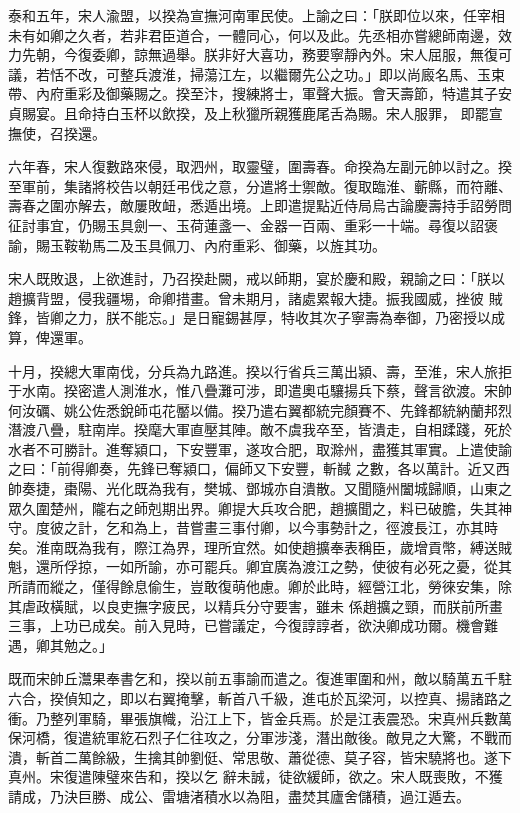 \begin{pinyinscope}
 泰和五年，宋人渝盟，以揆為宣撫河南軍民使。上諭之曰：「朕即位以來，任宰相未有如卿之久者，若非君臣道合，一體同心，何以及此。先丞相亦嘗總師南邊，效力先朝，今復委卿，諒無過舉。朕非好大喜功，務要寧靜內外。宋人屈服，無復可議，若恬不改，可整兵渡淮，掃蕩江左，以繼爾先公之功。」即以尚廄名馬、玉束帶、內府重彩及御藥賜之。揆至汴，搜練將士，軍聲大振。會天壽節，特遣其子安貞賜宴。且命持白玉杯以飲揆，及上秋獵所親獲鹿尾舌為賜。宋人服罪，
 即罷宣撫使，召揆還。



 六年春，宋人復數路來侵，取泗州，取靈璧，圍壽春。命揆為左副元帥以討之。揆至軍前，集諸將校告以朝廷弔伐之意，分遣將士禦敵。復取臨淮、蘄縣，而符離、壽春之圍亦解去，敵屢敗衄，悉遁出境。上即遣提點近侍局烏古論慶壽持手詔勞問征討事宜，仍賜玉具劍一、玉荷蓮盞一、金器一百兩、重彩一十端。尋復以詔褒諭，賜玉鞍勒馬二及玉具佩刀、內府重彩、御藥，以旌其功。



 宋人既敗退，上欲進討，乃召揆赴闕，戒以師期，宴於慶和殿，親諭之曰：「朕以趙擴背盟，侵我疆埸，命卿措畫。曾未期月，諸處累報大捷。振我國威，挫彼
 賊鋒，皆卿之力，朕不能忘。」是日寵錫甚厚，特收其次子寧壽為奉御，乃密授以成算，俾還軍。



 十月，揆總大軍南伐，分兵為九路進。揆以行省兵三萬出潁、壽，至淮，宋人旅拒于水南。揆密遣人測淮水，惟八疊灘可涉，即遣奧屯驤揚兵下蔡，聲言欲渡。宋帥何汝礪、姚公佐悉銳師屯花靨以備。揆乃遣右翼都統完顏賽不、先鋒都統納蘭邦烈潛渡八疊，駐南岸。揆麾大軍直壓其陣。敵不虞我卒至，皆潰走，自相蹂踐，死於水者不可勝計。進奪潁口，下安豐軍，遂攻合肥，取滁州，盡獲其軍實。上遣使諭之曰：「前得卿奏，先鋒已奪潁口，偏師又下安豐，斬馘
 之數，各以萬計。近又西帥奏捷，棗陽、光化既為我有，樊城、鄧城亦自潰散。又聞隨州闔城歸順，山東之眾久圍楚州，隴右之師剋期出界。卿提大兵攻合肥，趙擴聞之，料已破膽，失其神守。度彼之計，乞和為上，昔嘗畫三事付卿，以今事勢計之，徑渡長江，亦其時矣。淮南既為我有，際江為界，理所宜然。如使趙擴奉表稱臣，歲增貢幣，縛送賊魁，還所俘掠，一如所諭，亦可罷兵。卿宜廣為渡江之勢，使彼有必死之憂，從其所請而縱之，僅得餘息偷生，豈敢復萌他慮。卿於此時，經營江北，勞徠安集，除其虐政橫賦，以良吏撫字疲民，以精兵分守要害，雖未
 係趙擴之頸，而朕前所畫三事，上功已成矣。前入見時，已嘗議定，今復諄諄者，欲決卿成功爾。機會難遇，卿其勉之。」



 既而宋帥丘灊果奉書乞和，揆以前五事諭而遣之。復進軍圍和州，敵以騎萬五千駐六合，揆偵知之，即以右翼掩擊，斬首八千級，進屯於瓦梁河，以控真、揚諸路之衝。乃整列軍騎，畢張旗幟，沿江上下，皆金兵焉。於是江表震恐。宋真州兵數萬保河橋，復遣統軍紇石烈子仁往攻之，分軍涉淺，潛出敵後。敵見之大驚，不戰而潰，斬首二萬餘級，生擒其帥劉侹、常思敬、蕭從德、莫子容，皆宋驍將也。遂下真州。宋復遣陳璧來告和，揆以乞
 辭未誠，徒欲緩師，欲之。宋人既喪敗，不獲請成，乃決巨勝、成公、雷塘渚積水以為阻，盡焚其廬舍儲積，過江遁去。




\end{pinyinscope}
